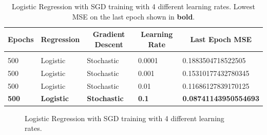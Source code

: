 \documentclass{article} %
\begin{document}
\begin{table}[!htbp]
\caption{Logistic Regression with SGD training with 4 different learning rates. Lowest MSE on the last epoch shown in \textbf{bold}.}
\label{Table5}
\begin{center}
\begin{tabular}{l l l l l}
\multicolumn{1}{c}{\bf Epochs} &\multicolumn{1}{c}{\bf Regression}  &\multicolumn{1}{c}{\bf Gradient Descent} &\multicolumn{1}{c}{\bf Learning Rate} &\multicolumn{1}{c}{\bf Last Epoch MSE}
\\ \hline \\

500 & Logistic & Stochastic & 0.0001    & 0.1883504718522505\\
500 & Logistic & Stochastic & 0.001     & 0.15310177432780345\\
500 & Logistic & Stochastic & 0.01      & 0.11686127839170125\\

\textbf{500} & \textbf{Logistic} & \textbf{Stochastic} & \textbf{0.1} & \textbf{0.08741143950554693}\\

\end{tabular}
\end{center}
\end{table}

\begin{figure}[ht]
\begin{center}
\end{center}
\caption{Logistic Regression with SGD training with 4 different learning rates.}
\label{Fig7}
\end{figure}
\end{document}
